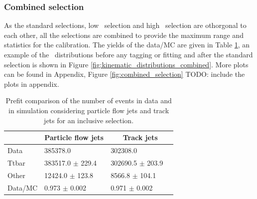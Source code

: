 \documentclass[letterpaper,12pt]{article}
\begin{document}
\subsubsection{Combined selection}
\label{combined_selection}
As the standard selections, low \pt\ selection and high \pt\ selection are othorgonal 
to each other, all the selections are combined to provide the maximum range 
and statistics for the calibration. 
The yields of the data/MC are given in Table \ref{tab:yields_combined}, 
an example of the \pt\ distributions before any tagging or fitting and 
after the standard selection is shown in Figure \ref{fig:kinematic_distributions_combined}. More plots 
can be found in Appendix, Figure \ref{fig:combined_selection} TODO: include the plots in appendix.
\begin{table}[!b]
	\centering
	\small
	\setlength\tabcolsep{5pt} 
	\begin{tabular}{|l | ll | ll |}
	\hline
	& \multicolumn{2}{c|}{Particle flow jets} & \multicolumn{2}{c|}{Track jets} \\
	\hline
	Data          &    385378.0                  &        &   302308.0              &     \\  
	Ttbar         &    383517.0 $\pm$      229.4 &        &   302690.5 $\pm$      203.9 &   \\
	Other         &     12424.0 $\pm$      123.8 &        &     8566.8 $\pm$      104.1 &   \\
	Data/MC       &    0.973 $\pm$ 0.002         &        &  0.971 $\pm$ 0.002  &           \\
	\hline
	\end{tabular}
	\vspace{0.2cm}
	\caption{Prefit comparison of the  number of events in data and in 
	simulation considering particle flow jets and track jets for an inclusive
	selection.}
	\label{tab:yields_combined}
	\end{table}
\end{document}
